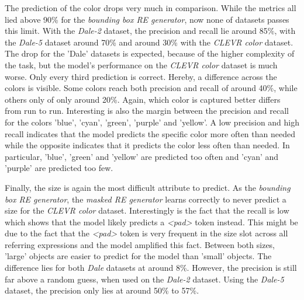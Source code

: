The prediction of the color drops very much in comparison.
While the metrics all lied above 90\% for the \emph{bounding box RE generator}, now none of datasets passes this limit.
With the \emph{Dale-2} dataset, the precision and recall lie around 85\%, with the \emph{Dale-5} dataset around 70\% and around 30\% with the \emph{CLEVR color} dataset.
The drop for the 'Dale' datasets is expected, because of the higher complexity of the task, but the model's performance on the \emph{CLEVR color} dataset is much worse.
Only every third prediction is correct.
Hereby, a difference across the colors is visible.
Some colors reach both precision and recall of around 40\%, while others only of only around 20\%.
Again, which color is captured better differs from run to run.
Interesting is also the margin between the precision and recall for the colors 'blue', 'cyan', 'green', 'purple' and 'yellow'.
A low precision and high recall indicates that the model predicts the specific color more often than needed while the opposite indicates that it predicts the color less often than needed.
In particular, 'blue', 'green' and 'yellow' are predicted too often and 'cyan' and 'purple' are predicted too few.

Finally, the size is again the most difficult attribute to predict.
As the \emph{bounding box RE generator}, the \emph{masked RE generator} learns correctly to never predict a size for the \emph{CLEVR color} dataset.
Interestingly is the fact that the recall is low which shows that the model likely predicts a \emph{<pad>} token instead.
This might be due to the fact that the \emph{<pad>} token is very frequent in the size slot across all referring expressions and the model amplified this fact.
Between both sizes, 'large' objects are easier to predict for the model than 'small' objects.
The difference lies for both \emph{Dale} datasets at around 8\%.
However, the precision is still far above a random guess, when used on the \emph{Dale-2} dataset.
Using the \emph{Dale-5} dataset, the precision only lies at around 50\% to 57\%.




